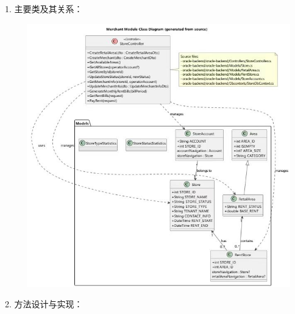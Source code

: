 \documentclass[]{article}
\let\oldincludegraphics\includegraphics
\renewcommand{\includegraphics}[2][]{%
  \begin{center}\oldincludegraphics[#1]{#2}\end{center}%
}
\begin{document}
1. 主要类及其关系：

\includegraphics[width=6.2in,height=4.5in]{media/2.7/uml.jpg} %

2. 方法设计与实现：
\end{document}
